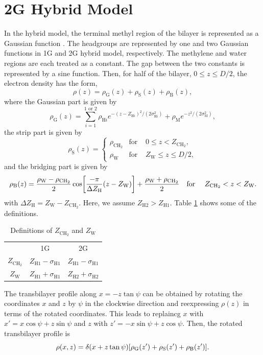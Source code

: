 \documentclass[12pt,letterpaper]{article}
\newcommand{\zh}[1]{Z_{\mathrm{H}#1}}
\newcommand{\zw}{Z_\mathrm{W}}
\newcommand{\zchtwo}{Z_\mathrm{CH_2}}
\newcommand{\sigmah}[1]{\sigma_{\mathrm{H}#1}}
\newcommand{\sigmam}{\sigma_\mathrm{M}}
\newcommand{\rhoh}[1]{\rho_{\mathrm{H}#1}}
\newcommand{\rhom}{\rho_\mathrm{M}}
\newcommand{\rhog}{\rho_\mathrm{G}}
\newcommand{\rhos}{\rho_\mathrm{S}}
\newcommand{\rhob}{\rho_\mathrm{B}}
\newcommand{\rhow}{\rho_\mathrm{W}}
\newcommand{\rhochtwo}{\rho_\mathrm{CH_2}}
\newcommand{\deltazh}{\Delta Z_\mathrm{H}}
\begin{document}
\section{2G Hybrid Model}
In the hybrid model, the terminal methyl region of the bilayer is represented
as a Gaussian function \cite{ref:Wiener89}. The headgroups are represented by one 
and two Gaussian
functions in 1G and 2G hybrid model, respectively. The methylene and water 
regions are each treated as a constant. The gap between the two constants is 
represented by a sine function. Then, for half of the bilayer, 
$0 \leq z \leq D/2$, the electron density has the form, 
\begin{equation}
  \rho(z) = \rhog(z) + \rhos(z) + \rhob(z),
\end{equation}
where the Gaussian part is given by 
\begin{equation}
  \rhog(z) = \sum_{i=1}^{1\text{ or }2} \rhoh{i}
             e^{-(z-\zh{i})^2/(2\sigmah{i}^2)} + \rhom e^{-z^2/(2\sigmam^2)},
\end{equation}
the strip part is given by
\begin{equation}
  \rhos(z) = \left\{
    \begin{array}{ccc}
      \rhochtwo & \text{for } & 0 \leq z < \zchtwo, \\
      \rhow   & \text{for } & \zw \leq z \leq D/2,
    \end{array}
  \right.
\end{equation}
and the bridging part is given by
\begin{equation}
  \rhob(z) = \frac{\rhow-\rhochtwo}{2} \cos \bracks{
    \frac{-\pi}{\deltazh}(z-\zw)} + \frac{\rhow+\rhochtwo}{2} \\
  \text{\quad for \quad} \zchtwo < z < \zw.
\end{equation}
with $\deltazh=\zw-\zchtwo$. Here, we assume $\zh{2}>\zh{1}$. 
Table \ref{tb:zchtwozw} shows some of the definitions.
\begin{table}[htb]
  \centering
  \begin{tabular}{c c c}
     & 1G & 2G \\
    $\zchtwo$ & $\zh{1}-\sigmah{1}$ & $\zh{1}-\sigmah{1}$ \\
    $\zw$ & $\zh{1}+\sigmah{1}$ & $\zh{2}+\sigmah{2}$   
  \end{tabular}
  \caption{Definitions of $\zchtwo$ and $\zw$}
  \label{tb:zchtwozw}
\end{table}
The transbilayer profile along $x=-z\tan\psi$ can be obtained by rotating
the coordinates $x$ and $z$ by $\psi$ in the clockwise direction and
reexpressing $\rho(z)$ in terms of the rotated coordinates. This leads
to replaincg $x$ with $x'=x\cos\psi+z\sin\psi$ and
$z$ with $z'=-x\sin\psi+z\cos\psi$. Then, the rotated transbilayer profile is
\begin{equation}
  \rho(x,z) = \delta(x+z\tan\psi)\bracks{\rhog(z') + \rhos(z') + \rhob(z')}.
  \label{eq:rotated_profile}
\end{equation}
\end{document}
